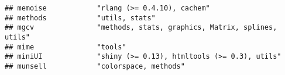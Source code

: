 \documentclass[
]{article}
\begin{document}
\begin{verbatim}
## memoise            "rlang (>= 0.4.10), cachem"                                                                                                                                                                                                                                                                                                                                                                                                                  
## methods            "utils, stats"                                                                                                                                                                                                                                                                                                                                                                                                                               
## mgcv               "methods, stats, graphics, Matrix, splines, utils"                                                                                                                                                                                                                                                                                                                                                                                           
## mime               "tools"                                                                                                                                                                                                                                                                                                                                                                                                                                      
## miniUI             "shiny (>= 0.13), htmltools (>= 0.3), utils"                                                                                                                                                                                                                                                                                                                                                                                                 
## munsell            "colorspace, methods"                                                                                                                                                                                                                                                                                                                                                                                                                        

\end{verbatim}
\end{document}
